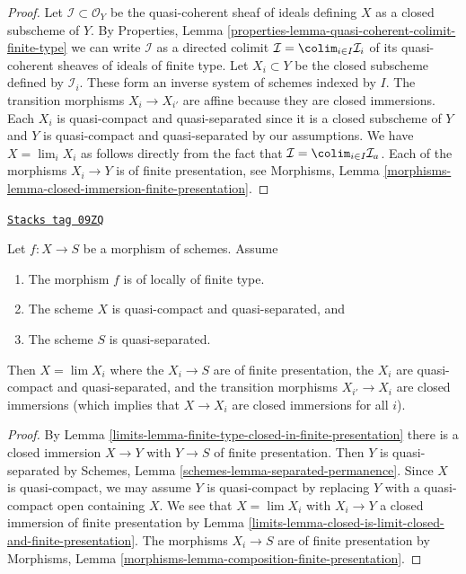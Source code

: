 \begin{proof}
Let $\mathcal{I} \subset \mathcal{O}_Y$ be the quasi-coherent sheaf of
ideals defining $X$ as a closed subscheme of $Y$. By
Properties, Lemma \ref{properties-lemma-quasi-coherent-colimit-finite-type}
we can write $\mathcal{I}$ as a directed colimit
$\mathcal{I} = \colim_{i \in I} \mathcal{I}_i$ of its
quasi-coherent sheaves of ideals of finite type.
Let $X_i \subset Y$ be the closed subscheme defined by $\mathcal{I}_i$.
These form an inverse system of schemes indexed by $I$.
The transition morphisms $X_i \to X_{i'}$ are affine because
they are closed immersions. Each $X_i$ is quasi-compact and quasi-separated
since it is a closed subscheme of $Y$ and $Y$ is quasi-compact and
quasi-separated by our assumptions.
We have $X = \lim_i X_i$ as follows directly from the
fact that $\mathcal{I} = \colim_{i \in I} \mathcal{I}_a$.
Each of the morphisms $X_i \to Y$ is of finite presentation, see
Morphisms, Lemma \ref{morphisms-lemma-closed-immersion-finite-presentation}.
\end{proof}

\begin{lemma}
\label{limits-lemma-finite-type-is-limit-finite-presentation}
\href{https://stacks.math.columbia.edu/tag/09ZQ}{\texttt{Stacks tag 09ZQ}}

Let $f : X \to S$ be a morphism of schemes. Assume
\begin{enumerate}
\item The morphism $f$ is of locally of finite type.
\item The scheme $X$ is quasi-compact and quasi-separated, and
\item The scheme $S$ is quasi-separated.
\end{enumerate}
Then $X = \lim X_i$ where the $X_i \to S$ are of
finite presentation, the $X_i$ are quasi-compact and quasi-separated,
and the transition morphisms $X_{i'} \to X_i$ are closed immersions
(which implies that $X \to X_i$ are closed immersions for all $i$).
\end{lemma}

\begin{proof}

By Lemma \ref{limits-lemma-finite-type-closed-in-finite-presentation}
there is a closed immersion $X \to Y$ with $Y \to S$ of
finite presentation. Then $Y$ is quasi-separated by
Schemes, Lemma \ref{schemes-lemma-separated-permanence}.
Since $X$ is quasi-compact, we may assume
$Y$ is quasi-compact by replacing $Y$ with a quasi-compact open
containing $X$. We see that $X = \lim X_i$ with $X_i \to Y$ a closed
immersion of finite presentation by
Lemma \ref{limits-lemma-closed-is-limit-closed-and-finite-presentation}.
The morphisms $X_i \to S$ are of finite presentation by
Morphisms, Lemma \ref{morphisms-lemma-composition-finite-presentation}.
\end{proof}

